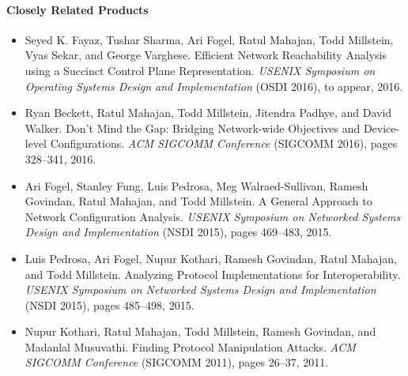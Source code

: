 \documentclass[11pt]{article}
\begin{document}
\paragraph{Closely Related Products}
\begin{itemize}

\item Seyed K. Fayaz,
              Tushar Sharma,
              Ari Fogel,
              Ratul Mahajan,
              Todd Millstein,
              Vyas Sekar, and
              George Varghese.  Efficient Network Reachability Analysis using a Succinct Control Plane Representation.  {\em USENIX Symposium on Operating Systems Design and Implementation} (OSDI 2016), to appear, 2016.

\item Ryan Beckett, Ratul Mahajan, Todd Millstein, Jitendra Padhye, and David Walker.  Don't Mind the Gap: Bridging Network-wide Objectives and Device-level Configurations.  {\em ACM SIGCOMM Conference} (SIGCOMM 2016), pages 328--341, 2016.

\item Ari Fogel, Stanley Fung, Luis Pedrosa, Meg Walraed-Sullivan, Ramesh Govindan, Ratul Mahajan, and Todd Millstein.  A General Approach to Network Configuration Analysis.  {\em USENIX Symposium on Networked Systems Design and Implementation} (NSDI 2015), pages 469--483, 2015.

\item Luis Pedrosa, Ari Fogel, Nupur Kothari, Ramesh Govindan, Ratul Mahajan, and 
Todd Millstein.  Analyzing Protocol Implementations for Interoperability.  {\em USENIX Symposium on Networked Systems Design and Implementation} (NSDI 2015), pages 485--498, 2015.

\item Nupur Kothari, Ratul Mahajan, Todd Millstein, Ramesh Govindan, and Madanlal Musuvathi.  Finding Protocol Manipulation Attacks.  {\em ACM SIGCOMM Conference} (SIGCOMM 2011), pages 26--37, 2011.

\end{itemize}
\end{document}
